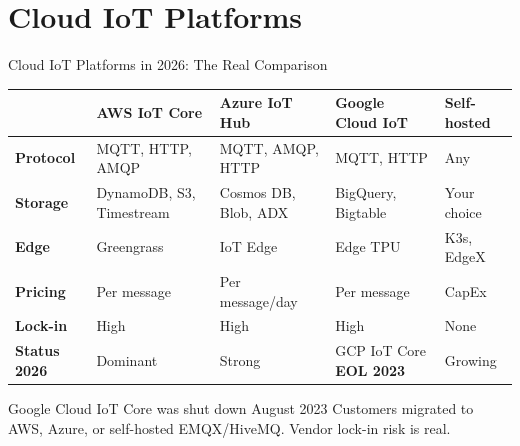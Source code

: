 \documentclass[aspectratio=169,11pt]{beamer}
\begin{document}
\section{Cloud IoT Platforms}

\begin{frame}{Cloud IoT Platforms in 2026: The Real Comparison}
    \vspace{0.05cm}
    \begin{center}
    \scriptsize
    \begin{tabular}{p{2.3cm}p{2.4cm}p{2.4cm}p{2.4cm}p{1.8cm}}
        \toprule
        & \textbf{AWS IoT Core} & \textbf{Azure IoT Hub} & \textbf{Google Cloud IoT} & \textbf{Self-hosted} \\
        \midrule
        \textbf{Protocol} & MQTT, HTTP, AMQP & MQTT, AMQP, HTTP & MQTT, HTTP & Any \\
        \textbf{Storage} & DynamoDB, S3, Timestream & Cosmos DB, Blob, ADX & BigQuery, Bigtable & Your choice \\
        \textbf{Edge} & Greengrass & IoT Edge & Edge TPU & K3s, EdgeX \\
        \textbf{Pricing} & Per message & Per message/day & Per message & CapEx \\
        \textbf{Lock-in} & High & High & High & None \\
        \textbf{Status 2026} & Dominant & Strong & GCP IoT Core \textbf{EOL 2023} & Growing \\
        \bottomrule
    \end{tabular}
    \normalsize
    \end{center}

    \begin{alertblock}{Google Cloud IoT Core was shut down August 2023}
        Customers migrated to AWS, Azure, or self-hosted EMQX/HiveMQ. Vendor lock-in risk is real.
    \end{alertblock}
\end{frame}
\end{document}
